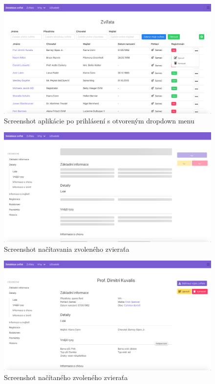 \vspace*{\fill}

\begin{figure}[H]
	\includegraphics[width=1.0\textwidth]{media/priloha/vseobecne/3.png}
	\caption{Screenshot aplikácie po prihlásení s otvoreným dropdown menu}
\end{figure}

\begin{figure}[H]
	\includegraphics[width=1.0\textwidth]{media/priloha/zviera/1.png}
	\caption{Screenshot načítavania zvoleného zvieraťa}
\end{figure}

\vspace*{\fill}

\begin{figure}[H]
	\includegraphics[width=1.0\textwidth]{media/priloha/zviera/2.png}
	\caption{Screenshot načítaného zvoleného zvieraťa}
\end{figure}

